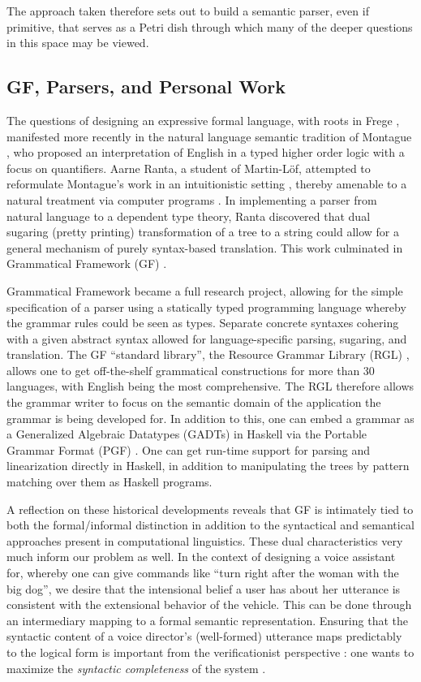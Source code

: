 \documentclass[a4paper, 11pt]{article}
\begin{document}
The approach taken therefore sets out to build a semantic parser, even if
primitive, that serves as a Petri dish through which many of the deeper questions
in this space may be viewed.

\subsection{GF, Parsers, and Personal Work}

The questions of designing an expressive formal language, with roots in Frege
\cite{frege79}, manifested more recently in the natural language semantic
tradition of Montague \cite{Montague1973}, who proposed an interpretation of
English in a typed higher order logic with a focus on quantifiers. Aarne Ranta,
a student of Martin-Löf, attempted to reformulate Montague's work in an
intuitionistic setting \cite{ranta1994type}, thereby amenable to a natural
treatment via computer programs \cite{ml79}. In implementing a parser from
natural language to a dependent type theory, Ranta discovered that dual sugaring
(pretty printing) transformation of a tree to a string could allow for a general
mechanism of purely syntax-based translation. This work culminated in
Grammatical Framework (GF) \cite{ranta_2004}.

Grammatical Framework became a full research project, allowing for the simple
specification of a parser using a statically typed programming language whereby
the grammar rules could be seen as types. Separate concrete syntaxes cohering
with a given abstract syntax allowed for language-specific parsing, sugaring,
and translation. The GF ``standard library'', the Resource Grammar Library (RGL)
\cite{ranta2009rgl}, allows one to get off-the-shelf grammatical constructions
for more than 30 languages, with English being the most comprehensive. The RGL
therefore allows the grammar writer to focus on the semantic domain of the
application the grammar is being developed for. In addition to this, one can
embed a grammar as a Generalized Algebraic Datatypes (GADTs) in Haskell via the
Portable Grammar Format (PGF) \cite{angelov2010pgf}. One can get run-time
support for parsing and linearization directly in Haskell, in addition to
manipulating the trees by pattern matching over them as Haskell programs.

A reflection on these historical developments reveals that GF is intimately tied
to both the formal/informal distinction in addition to the syntactical and
semantical approaches present in computational linguistics. These dual characteristics
very much inform our problem as well. In the context of designing a voice
assistant for, whereby one can give commands like ``turn
right after the woman with the big dog'', we desire that the intensional belief a
user has about her utterance is consistent with the extensional behavior of the
vehicle. This can be done through an intermediary mapping to a formal semantic
representation. Ensuring that the syntactic content of a voice director's
(well-formed) utterance maps predictably to the logical form is important from
the verificationist perspective : one wants to maximize the \emph{syntactic
completeness} of the system \cite{macmillan2021}.
\end{document}
